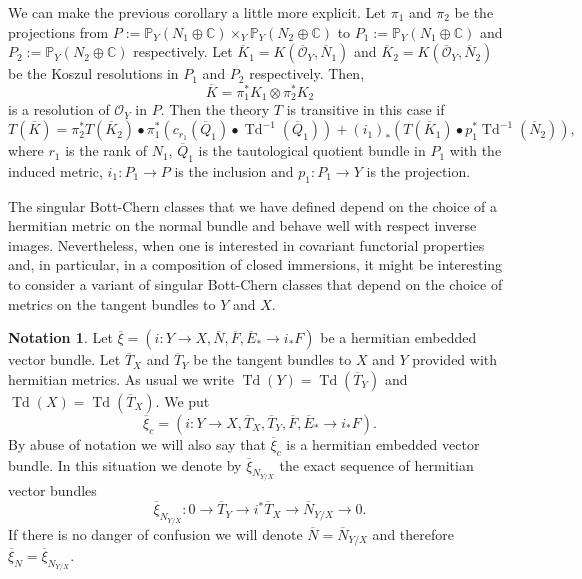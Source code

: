 \documentclass[10pt,twoside]{article}
\numberwithin{equation}{section}
\theoremstyle{plain}
\theoremstyle{definition}
\newtheorem{notation}[equation]{Notation}
\DeclareMathOperator{\Td}{Td}
\begin{document}
We can make the previous corollary a little more explicit. Let $\pi
_{1}$ and $\pi _{2}$ be the projections from
$P:=\mathbb{P}_{Y}(N_{1}\oplus \mathbb{C}) 
\times_{Y}
\mathbb{P}_{Y}(N_{2}\oplus \mathbb{C})$ to
$P_{1}:=\mathbb{P}_{Y}(N_{1}\oplus \mathbb{C})$ and
$P_{2}:=\mathbb{P}_{Y}(N_{2}\oplus \mathbb{C})$ respectively. Let
$\overline K_{1}=K(\overline{\mathcal{O}}_{Y},\overline N_{1})$ and
$\overline K_{2}=K(\overline{\mathcal{O}}_{Y},\overline N_{2})$ be the
Koszul resolutions in 
$P_{1}$ and $P_{2}$ respectively. Then, $$\overline K=\pi
_{1}^{\ast}K_{1}\otimes
\pi
_{2}^{\ast}K_{2} 
$$  
is a resolution of $\mathcal{O}_{Y}$ in $P$. Then the theory $T$ is
transitive in this case if
\begin{displaymath}
  T(\overline K)=\pi _{2}^{\ast}T(\overline K_{2})\bullet
  \pi _{1}^{\ast}(c_{r_{1}}(\overline Q_{1})\bullet \Td^{-1}(\overline
  Q_{1})) +
  (i_{1})_{\ast}(T(\overline K_{1})\bullet p_{1}^{\ast}
  \Td^{-1}(\overline N_{2})),
\end{displaymath}
where $r_{1}$ is the rank of $N_{1}$, $\overline
Q_{1}$
is the tautological quotient bundle in $P_{1}$ with the induced
metric, $i_{1}\colon P_{1}\longrightarrow P$ is the inclusion
and $p_{1}\colon P_{1}\longrightarrow Y$ is the projection.

The singular Bott-Chern classes that we have defined depend on the
choice of a hermitian metric on the normal bundle and behave well with
respect inverse images. Nevertheless, when
one is interested in covariant functorial properties and, in particular, in a
composition of closed immersions, it might be interesting to consider a
variant of singular Bott-Chern classes that depend on the choice of
metrics on the tangent bundles to $Y$ and $X$.

\begin{notation} \label{def:14}
Let $\overline {\xi}=(i\colon Y\longrightarrow X,\overline
N,\overline F,\overline E_{\ast}\to i_{\ast}F)$ be a hermitian embedded vector
bundle. Let $\overline T_{X}$ and $\overline T_{Y}$ be the tangent
bundles to $X$ and $Y$ provided with hermitian metrics. As usual we
write $\Td(Y)=\Td(\overline T_{Y})$ and $\Td(X)=\Td(\overline
T_{X})$. We put
\begin{displaymath}
  \overline {\xi}_{c}=(i\colon Y\longrightarrow X,\overline
  T_{X}, \overline T_{Y},\overline F,\overline E_{\ast}\to i_{\ast}F).
\end{displaymath}
By abuse of notation we will also say that $\overline {\xi}_{c}$
is a hermitian embedded vector bundle. In this situation we denote by
$\overline 
{\xi}_{N_{Y/X}}$ the exact sequence of hermitian vector bundles
\begin{displaymath}
  \overline {\xi}_{N_{Y/X}}\colon 
  0\longrightarrow \overline T_{Y}
  \longrightarrow i^{\ast}\overline T_{X}
  \longrightarrow \overline N_{Y/X}
  \longrightarrow 0.
\end{displaymath}
If there is no danger of confusion we will denote $\overline
N=\overline N_{Y/X}$ and therefore $\overline {\xi}_{N}=\overline
{\xi}_{N_{Y/X}}$.  
\end{notation}
\end{document}

